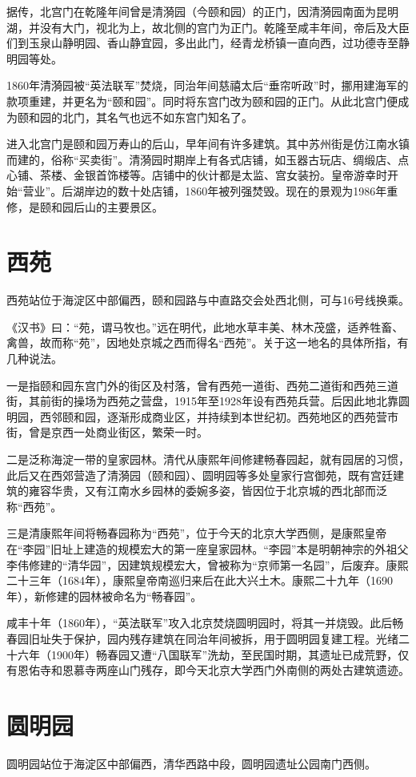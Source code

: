 据传，北宫门在乾隆年间曾是清漪园（今颐和园）的正门，因清漪园南面为昆明湖，并没有大门，视北为上，故北侧的宫门为正门。乾隆至咸丰年间，帝后及大臣们到玉泉山静明园、香山静宜园，多出此门，经青龙桥镇一直向西，过功德寺至静明园等处。

1860年清漪园被“英法联军”焚烧，同治年间慈禧太后“垂帘听政”时，挪用建海军的款项重建，并更名为“颐和园”。同时将东宫门改为颐和园的正门。从此北宫门便成为颐和园的北门，其名气也远不如东宫门知名了。

进入北宫门是颐和园万寿山的后山，早年间有许多建筑。其中苏州街是仿江南水镇而建的，俗称“买卖街”。清漪园时期岸上有各式店铺，如玉器古玩店、绸缎店、点心铺、茶楼、金银首饰楼等。店铺中的伙计都是太监、宫女装扮。皇帝游幸时开始“营业”。后湖岸边的数十处店铺，1860年被列强焚毁。现在的景观为1986年重修，是颐和园后山的主要景区。

\section{西苑}
西苑站位于海淀区中部偏西，颐和园路与中直路交会处西北侧，可与16号线换乘。

《汉书》曰：“苑，谓马牧也。”远在明代，此地水草丰美、林木茂盛，适养牲畜、禽兽，故而称“苑”，因地处京城之西而得名“西苑”。关于这一地名的具体所指，有几种说法。

一是指颐和园东宫门外的街区及村落，曾有西苑一道街、西苑二道街和西苑三道街，其前街的操场为西苑之营盘，1915年至1928年设有西苑兵营。后因此地北靠圆明园，西邻颐和园，逐渐形成商业区，并持续到本世纪初。西苑地区的西苑营市街，曾是京西一处商业街区，繁荣一时。

二是泛称海淀一带的皇家园林。清代从康熙年间修建畅春园起，就有园居的习惯，此后又在西郊营造了清漪园（颐和园）、圆明园等多处皇家行宫御苑，既有宫廷建筑的雍容华贵，又有江南水乡园林的委婉多姿，皆因位于北京城的西北部而泛称“西苑”。

三是清康熙年间将畅春园称为“西苑”，位于今天的北京大学西侧，是康熙皇帝在“李园”旧址上建造的规模宏大的第一座皇家园林。“李园”本是明朝神宗的外祖父李伟修建的“清华园”，因建筑规模宏大，曾被称为“京师第一名园”，后废弃。康熙二十三年（1684年），康熙皇帝南巡归来后在此大兴土木。康熙二十九年（1690年），新修建的园林被命名为“畅春园”。

咸丰十年（1860年），“英法联军”攻入北京焚烧圆明园时，将其一并烧毁。此后畅春园旧址失于保护，园内残存建筑在同治年间被拆，用于圆明园复建工程。光绪二十六年（1900年）畅春园又遭“八国联军”洗劫，至民国时期，其遗址已成荒野，仅有恩佑寺和恩慕寺两座山门残存，即今天北京大学西门外南侧的两处古建筑遗迹。

\section{圆明园}
圆明园站位于海淀区中部偏西，清华西路中段，圆明园遗址公园南门西侧。

